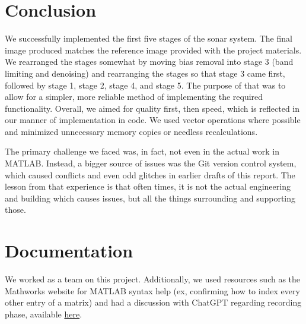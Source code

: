 
\section{Conclusion}
We successfully implemented the first five stages of the sonar system. The final image produced matches the
 reference image provided with the project materials. We rearranged the stages somewhat by moving bias removal
 into stage 3 (band limiting and denoising) and rearranging the stages so that stage 3 came first, followed by
 stage 1, stage 2, stage 4, and stage 5. The purpose of that was to allow for a simpler, more reliable method
 of implementing the required functionality. Overall, we aimed for quality first, then speed, which is reflected
 in our manner of implementation in code. We used vector operations where possible and minimized unnecessary
 memory copies or needless recalculations.

The primary challenge we faced was, in fact, not even in the actual work in MATLAB. Instead, a bigger source of
 issues was the Git version control system, which caused conflicts and even odd glitches in earlier drafts of
 this report. The lesson from that experience is that often times, it is not the actual engineering and building
 which causes issues, but all the things surrounding and supporting those.

\section*{Documentation}
We worked as a team on this project.  Additionally, we used resources such as the Mathworks website for \textsc{MATLAB} syntax help (ex, confirming how to index every other entry of a matrix) and had a discussion with ChatGPT regarding recording phase, available \href{https://chatgpt.com/c/673ff615-bf94-800b-a437-6f861b769c24}{here}.